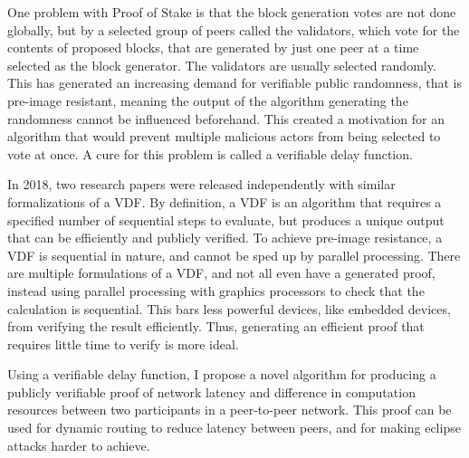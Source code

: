 One problem with Proof of Stake is that the block generation votes are not done globally, but by a selected group of peers called the validators, which vote for the contents of proposed blocks, that are generated by just one peer at a time selected as the block generator. The validators are usually selected randomly. This has generated an increasing demand for verifiable public randomness, that is pre-image resistant, meaning the output of the algorithm generating the randomness cannot be influenced beforehand. This created a motivation for an algorithm that would prevent multiple malicious actors from being selected to vote at once. A cure for this problem is called a verifiable delay function.

In 2018, two research papers were released independently with similar formalizations of a VDF.\cite{wesolowski_efficient_2018}\cite{pietrzak_simple_2018} By definition, a VDF is an algorithm that requires a specified number of sequential steps to evaluate, but produces a unique output that can be efficiently and publicly verified.\cite{boneh_verifiable_2018} To achieve pre-image resistance, a VDF is sequential in nature, and cannot be sped up by parallel processing. There are multiple formulations of a VDF, and not all even have a generated proof, instead using parallel processing with graphics processors to check that the calculation is sequential.\cite{yakovenko_solana_2018} This bars less powerful devices, like embedded devices, from verifying the result efficiently. Thus, generating an efficient proof that requires little time to verify is more ideal.\cite{boneh_verifiable_2018}

Using a verifiable delay function, I propose a novel algorithm for producing a publicly verifiable proof of network latency and difference in computation resources between two participants in a peer-to-peer network. This proof can be used for dynamic routing to reduce latency between peers, and for making eclipse attacks harder to achieve.

